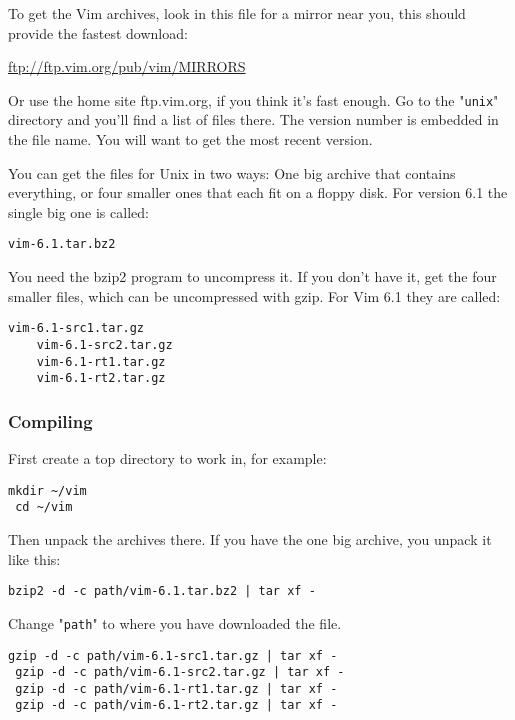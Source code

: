 To get the Vim archives, look in this file for a mirror near you, this should provide the fastest download:

    \url{ftp://ftp.vim.org/pub/vim/MIRRORS} 

Or use the home site ftp.vim.org, if you think it's fast enough.
Go to the "\texttt{unix}" directory and you'll find a list of files there.
The version number is embedded in the file name.
You will want to get the most recent version.

You can get the files for Unix in two ways: One big archive that contains everything, or four smaller ones that each fit on a floppy disk.
For version 6.1 the single big one is called:

\begin{Verbatim}[samepage=true]
    vim-6.1.tar.bz2 
\end{Verbatim}

You need the bzip2 program to uncompress it.
If you don't have it, get the four smaller files, which can be uncompressed with gzip.
For Vim 6.1 they are called:

\begin{Verbatim}[samepage=true]
    vim-6.1-src1.tar.gz 
    vim-6.1-src2.tar.gz 
    vim-6.1-rt1.tar.gz 
    vim-6.1-rt2.tar.gz 
\end{Verbatim}

\subsubsection{Compiling}
First create a top directory to work in, for example:

\begin{Verbatim}[samepage=true]
 mkdir ~/vim
 cd ~/vim
\end{Verbatim}

Then unpack the archives there.
If you have the one big archive, you unpack it like this:

\begin{Verbatim}[samepage=true]
 bzip2 -d -c path/vim-6.1.tar.bz2 | tar xf -
\end{Verbatim}

Change "\texttt{path}" to where you have downloaded the file.

\begin{Verbatim}[samepage=true]
 gzip -d -c path/vim-6.1-src1.tar.gz | tar xf -
 gzip -d -c path/vim-6.1-src2.tar.gz | tar xf -
 gzip -d -c path/vim-6.1-rt1.tar.gz | tar xf -
 gzip -d -c path/vim-6.1-rt2.tar.gz | tar xf -
\end{Verbatim}

